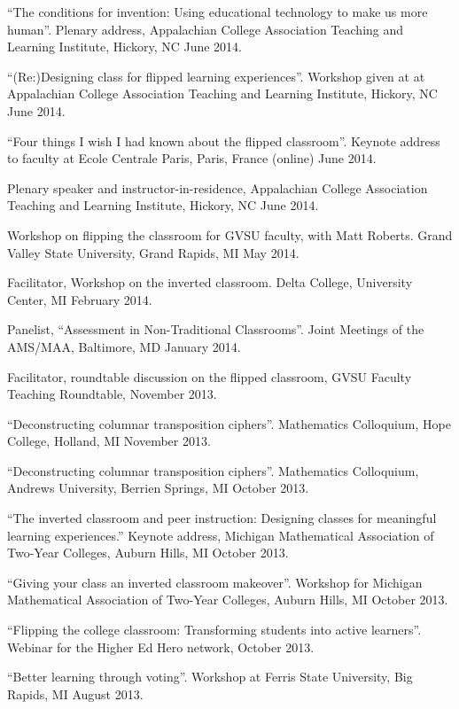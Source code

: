 \documentclass[letterpaper]{article}
\renewenvironment{itemize}{
  \begin{list}{}{
    \setlength{\leftmargin}{1.5em}
	\setlength{\itemsep}{0in}
  }
}{
  \end{list}
}
\begin{document}
\begin{itemize}
	\item ``The conditions for invention: Using educational technology to make us more human''. Plenary address, Appalachian College Association Teaching and Learning Institute, Hickory, NC June 2014.
	\item ``(Re:)Designing class for flipped learning experiences''.  Workshop given at at Appalachian College Association Teaching and Learning Institute, Hickory, NC June 2014. 
	\item ``Four things I wish I had known about the flipped classroom''. Keynote address to faculty at Ecole Centrale Paris, Paris, France (online) June 2014. 
	\item Plenary speaker and instructor-in-residence, Appalachian College Association Teaching and Learning Institute, Hickory, NC June 2014. 
	\item Workshop on flipping the classroom for GVSU faculty, with Matt Roberts. Grand Valley State University, Grand Rapids, MI May 2014. 
	\item Facilitator, Workshop on the inverted classroom. Delta College, University Center, MI February 2014. 
	\item Panelist, ``Assessment in Non-Traditional Classrooms''. Joint Meetings of the AMS/MAA, Baltimore, MD January 2014. 
	\item Facilitator, roundtable discussion on the flipped classroom, GVSU Faculty Teaching Roundtable, November 2013. 
	\item ``Deconstructing columnar transposition ciphers''. Mathematics Colloquium, Hope College, Holland, MI November 2013. 
	\item ``Deconstructing columnar transposition ciphers''. Mathematics Colloquium, Andrews University, Berrien Springs, MI October 2013.
	\item ``The inverted classroom and peer instruction: Designing classes for meaningful learning experiences.'' Keynote address, Michigan Mathematical Association of Two-Year Colleges, Auburn Hills, MI October 2013. 
	\item ``Giving your class an inverted classroom makeover''. Workshop for Michigan Mathematical Association of Two-Year Colleges, Auburn Hills, MI October 2013. 
	\item ``Flipping the college classroom: Transforming students into active learners''. Webinar for the Higher Ed Hero network, October 2013. 
	\item ``Better learning through voting''. Workshop at Ferris State University, Big Rapids, MI August 2013.

\end{itemize}
\end{document}
